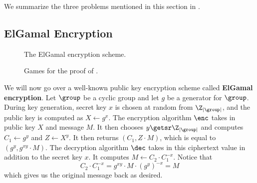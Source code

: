 We summarize the three problems mentioned in this section in . 

\subsection{ElGamal Encryption}

\begin{figure}
	\center
	\caption{The ElGamal encryption scheme.}
	\label{fig:elgamal}
\end{figure}

\begin{wrapfigure}{r}{1.5in}
	\center
	\caption{Games for the proof of .}
	\label{fig:elgamal-games}
\end{wrapfigure}

We will now go over a well-known public key encryption scheme called \textbf{ElGamal encryption}. Let $\group$ be a cyclic group and let $g$ be a generator for $\group$. During key generation, secret key $x$ is chosen at random from $\Z_{|\group|}$, and the public key is computed as $X \gets g^x$. The encryption algorithm $\enc$ takes in public key $X$ and message $M$. It then chooses $y\getsr \Z_{|\group|}$ and computes $C_1 \gets g^y$ and $Z \gets X^y$. It then returns $(C_1, Z \cdot M)$, which is equal to $(g^y, g^{xy} \cdot M)$. The decryption algorithm $\dec$ takes in this ciphertext value in addition to the secret key $x$. It computes $M \gets C_2 \cdot C_1^{-x}$. Notice that
\begin{equation*}
	C_2 \cdot C_1^{-x} = g^{xy} \cdot M \cdot (g^y)^{-x} = M
\end{equation*}
which gives us the original message back as desired. 

